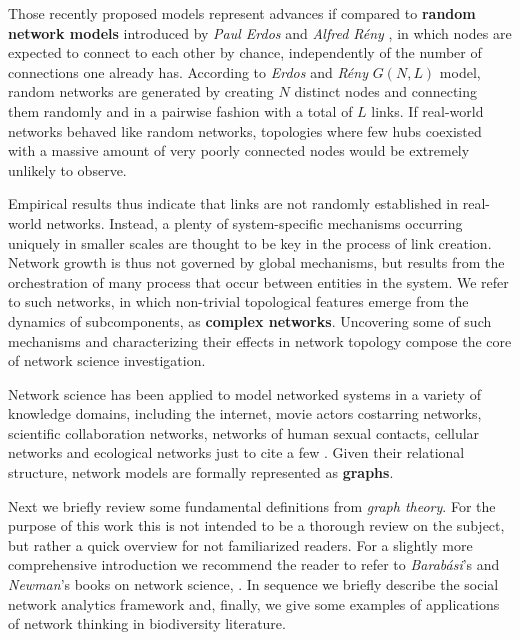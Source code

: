 Those recently proposed models represent advances if compared to \textbf{random network models} introduced by \textit{Paul Erdos} and \textit{Alfred Rény} \cite{erdos1959random}, in which nodes are expected to connect to each other by chance, independently of the number of connections one already has.
According to \textit{Erdos} and \textit{Rény} $G(N,L)$ model, random networks are generated by creating $N$ distinct nodes and connecting them randomly and in a pairwise fashion with a total of $L$ links. 
If real-world networks behaved like random networks, topologies where few hubs coexisted with a massive amount of very poorly connected nodes would be extremely unlikely to observe. 

Empirical results thus indicate that links are not randomly established in real-world networks.
Instead, a plenty of system-specific mechanisms occurring uniquely in smaller scales are thought to be key in the process of link creation.
Network growth is thus not governed by global mechanisms, but results from the orchestration of many process that occur between entities in the system.
We refer to such networks, in which non-trivial topological features emerge from the dynamics of subcomponents, as \textbf{complex networks}.
Uncovering some of such mechanisms and characterizing their effects in network topology compose the core of network science investigation.


Network science has been applied to model networked systems in a variety of knowledge domains, including the internet, movie actors costarring networks, scientific collaboration networks, networks of human sexual contacts, cellular networks and ecological networks just to cite a few \cite{Albert2002}.
Given their relational structure, network models are formally represented as \textbf{graphs}.

Next we briefly review some fundamental definitions from \textit{graph theory}.
For the purpose of this work this is not intended to be a thorough review on the subject, but rather a quick overview for not familiarized readers. 
For a slightly more comprehensive introduction we recommend the reader to refer to \textit{Barabási}'s and \textit{Newman}'s books on network science, \cite{Barabasibook,Newman2010b}.
In sequence we briefly describe the social network analytics framework and, 
finally, we give some examples of applications of network thinking in biodiversity literature.

